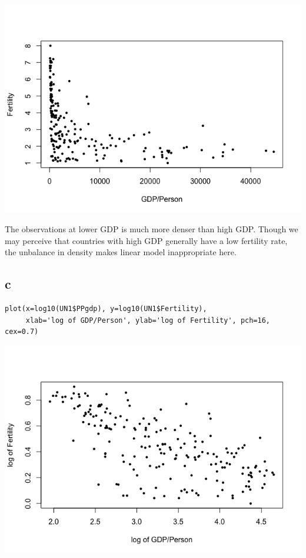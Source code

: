 \documentclass[11pt,letterpaper]{article}
\begin{document}
\includegraphics[scale=0.6]{2-b-1.png}

\noindent The observations at lower GDP is much more denser than high GDP. Though we may perceive that countries with high GDP generally have a low fertility rate, the unbalance in density makes linear model inappropriate here. 

\subsection*{c}
\begin{verbatim}
plot(x=log10(UN1$PPgdp), y=log10(UN1$Fertility),
     xlab='log of GDP/Person', ylab='log of Fertility', pch=16, cex=0.7) 
\end{verbatim}

\includegraphics[scale=0.6]{2-c-1.png}
\end{document}

